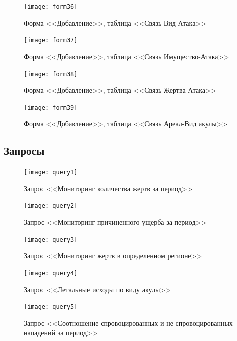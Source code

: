 \documentclass[russian,utf8,simple,emptystyle]{eskdtext}
\begin{document}
\begin{figure}[hb]
\centering
\texttt{[image: form36]}
\caption{Форма <<Добавление>>, таблица <<Связь Вид-Атака>>}
\end{figure}

\begin{figure}[ht]
\centering
\texttt{[image: form37]}
\caption{Форма <<Добавление>>, таблица <<Связь Имущество-Атака>>}
\end{figure}

\begin{figure}[hb]
\centering
\texttt{[image: form38]}
\caption{Форма <<Добавление>>, таблица <<Связь Жертва-Атака>>}
\end{figure}

\begin{figure}[ht]
\centering
\texttt{[image: form39]}
\caption{Форма <<Добавление>>, таблица <<Связь Ареал-Вид акулы>>}
\end{figure}

\clearpage
\subsection{Запросы}

\begin{figure}[ht]
\centering
\texttt{[image: query1]}
\caption{Запрос <<Мониторинг количества жертв за период>>}
\end{figure}


\begin{figure}[ht]
\centering
\texttt{[image: query2]}
\caption{Запрос <<Мониторинг причиненного ущерба за период>>}
\end{figure}

\begin{figure}[ht]
\centering
\texttt{[image: query3]}
\caption{Запрос <<Мониторинг жертв в определенном регионе>>}
\end{figure}

\begin{figure}[ht]
\centering
\texttt{[image: query4]}
\caption{Запрос <<Летальные исходы по виду акулы>>}
\end{figure}

\begin{figure}[ht]
\centering
\texttt{[image: query5]}
\caption{Запрос <<Соотношение спровоцированных и не спровоцированных нападений за период>>}
\end{figure}
\end{document}
